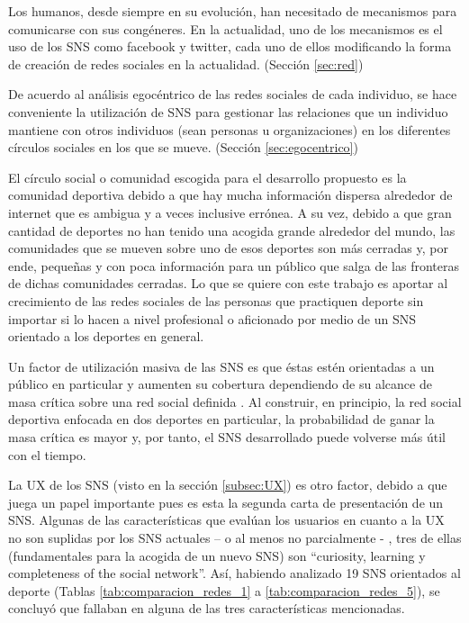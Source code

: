 Los humanos, desde siempre en su evolución, han necesitado de mecanismos para comunicarse con sus congéneres. En la actualidad, uno de los mecanismos es el uso de los SNS como facebook y twitter, cada uno de ellos modificando la forma de creación de redes sociales en la actualidad. (Sección \ref{sec:red})

De acuerdo al análisis egocéntrico de las redes sociales de cada individuo, se hace conveniente la utilización de SNS para gestionar las relaciones que un individuo mantiene con otros individuos (sean personas u organizaciones) en los diferentes círculos sociales en los que se mueve. (Sección \ref{sec:egocentrico})

El círculo social o comunidad escogida para el desarrollo propuesto es la comunidad deportiva debido a que hay mucha información dispersa alrededor de internet que es ambigua y a veces inclusive errónea. A su vez, debido a que gran cantidad de deportes no han tenido una acogida grande alrededor del mundo, las comunidades que se mueven sobre uno de esos deportes son más cerradas y, por ende, pequeñas y con poca información para un público que salga de las fronteras de dichas comunidades cerradas. Lo que se quiere con este trabajo es aportar al crecimiento de las redes sociales de las personas que practiquen deporte sin importar si lo hacen a nivel profesional o aficionado por medio de un SNS orientado a los deportes en general.

Un factor de utilización masiva de las SNS es que éstas estén orientadas a un público en particular y aumenten su cobertura dependiendo de su alcance de masa crítica sobre una red social definida \cite{sna_startups}. Al construir, en principio, la red social deportiva enfocada en dos deportes en particular, la probabilidad de ganar la masa crítica es mayor y, por tanto, el SNS desarrollado puede volverse más útil con el tiempo.

La UX de los SNS (visto en la sección \ref{subsec:UX}) es otro factor, debido a que juega un papel importante pues es esta la segunda carta de presentación de un SNS. Algunas de las características que evalúan los usuarios en cuanto a la UX no son suplidas por los SNS actuales – o al menos no parcialmente - , tres de ellas (fundamentales para la acogida de un nuevo SNS) son “curiosity, learning y completeness of the social network”. Así, habiendo analizado 19 SNS orientados al deporte (Tablas \ref{tab:comparacion_redes_1} a \ref{tab:comparacion_redes_5}), se concluyó que fallaban en alguna de las tres características mencionadas.

